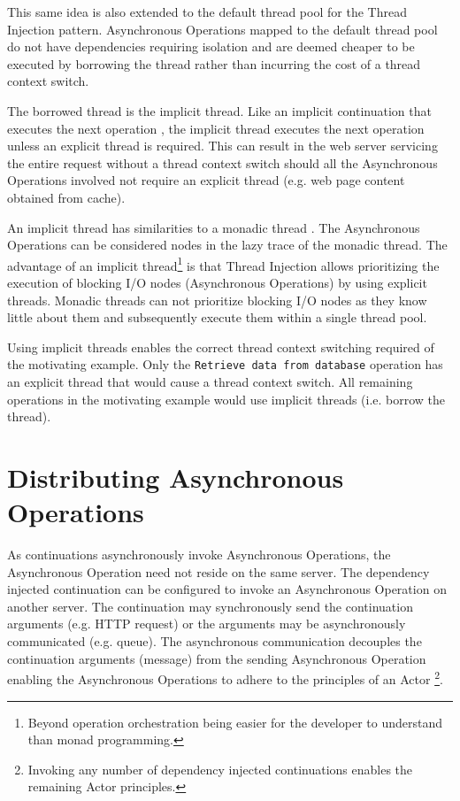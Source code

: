 \documentclass[prodmode]{style/acmlarge}
\begin{document}
This same idea is also extended to the default thread pool for the Thread
Injection pattern.  Asynchronous Operations mapped to the default thread pool do
not have dependencies requiring isolation and are deemed cheaper to be executed
by borrowing the thread rather than incurring the cost of a thread context
switch.

The borrowed thread is the implicit thread.  Like an implicit continuation that
executes the next operation \cite{continuations}, the implicit thread executes
the next operation unless an explicit thread is required.  This can result in
the web server servicing the entire request without a thread context switch
should all the Asynchronous Operations involved not require an explicit thread
(e.g. web page content obtained from cache).

An implicit thread has similarities to a monadic thread \cite{monadic-thread}.
The Asynchronous Operations can be considered nodes in the lazy trace of the
monadic thread.  The advantage of an implicit thread\footnote{Beyond operation
orchestration being easier for the developer to understand than monad
programming.} is that Thread Injection allows prioritizing the execution of
blocking I/O nodes (Asynchronous Operations) by using explicit threads.  Monadic
threads can not prioritize blocking I/O nodes as they know little about them and
subsequently execute them within a single thread pool.

Using implicit threads enables the correct thread context switching required of
the motivating example.  Only the \texttt{Retrieve data from database} operation
has an explicit thread that would cause a thread context switch.  All remaining
operations in the motivating example would use implicit threads (i.e.
borrow the thread).


\section{Distributing Asynchronous Operations}

As continuations asynchronously invoke Asynchronous Operations, the Asynchronous
Operation need not reside on the same server.  The dependency injected
continuation can be configured to invoke an Asynchronous Operation on another
server.  The continuation may synchronously send the continuation arguments
(e.g. HTTP request) or the arguments may be asynchronously communicated (e.g.
queue).  The asynchronous communication decouples the continuation arguments
(message) from the sending Asynchronous Operation enabling the Asynchronous
Operations to adhere to the principles of an Actor
\cite{actors}\footnote{Invoking any number of dependency injected continuations
enables the remaining Actor principles.}.
\end{document}
